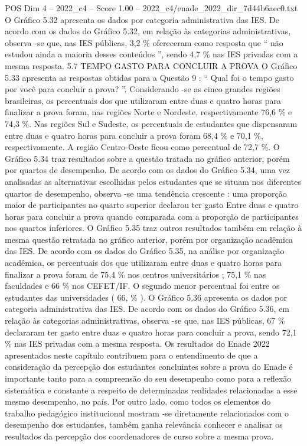 \begin{textsample}{POS Dim 4 – 2022\_c4 – Score 1.00 – 2022\_c4/enade\_2022\_dir\_7d44b6aec0.txt}
O Gráfico 5.32 apresenta os dados por categoria administrativa das IES.
De acordo com os dados do Gráfico 5.32, em relação às categorias administrativas, observa -se que, nas IES públicas, 3,2 \% ofereceram como resposta que “ não estudou ainda a maioria desses conteúdos ”, sendo 4,7 \% nas IES privadas com a mesma resposta. 5.7 TEMPO GASTO PARA CONCLUIR A PROVA O Gráfico 5.33 apresenta as respostas obtidas para a Questão 9 : “ Qual foi o tempo gasto por você para concluir a prova? ”.
Considerando -se as cinco grandes regiões brasileiras, os percentuais dos que utilizaram entre duas e quatro horas para finalizar a prova foram, nas regiões Norte e Nordeste, respectivamente 76,6 \% e 74,3 \%.
Nas regiões Sul e Sudeste, os percentuais de estudantes que dispensaram entre duas e quatro horas para concluir a prova foram 68,4 \% e 70,1 \%, respectivamente.
A região Centro-Oeste ficou como percentual de 72,7 \%.
O Gráfico 5.34 traz resultados sobre a questão tratada no gráfico anterior, porém por quartos de desempenho.
De acordo com os dados do Gráfico 5.34, uma vez analisadas as alternativas escolhidas pelos estudantes que se situam nos diferentes quartos de desempenho, observa -se uma tendência crescente : uma proporção maior de participantes no quarto superior declarou ter gasto Entre duas e quatro horas para concluir a prova quando comparada com a proporção de participantes nos quartos inferiores.
O Gráfico 5.35 traz outros resultados também em relação à mesma questão retratada no gráfico anterior, porém por organização acadêmica das IES.
De acordo com os dados do Gráfico 5.35, na análise por organização acadêmica, os percentuais dos que utilizaram entre duas e quatro horas para finalizar a prova foram de 75,4 \% nos centros universitários ; 75,1 \% nas faculdades e 66 \% nos CEFET/IF.
O segundo menor percentual foi entre os estudantes das universidades ( 66, \% ).
O Gráfico 5.36 apresenta os dados por categoria administrativa das IES.
De acordo com os dados do Gráfico 5.36, em relação às categorias administrativas, observa -se que, nas IES públicas, 67 \% declararam ter gasto entre duas e quatro horas para concluir a prova, sendo 72,1 \% nas IES privadas com a mesma resposta.
Os resultados do Enade 2022 apresentados neste capítulo contribuem para o entendimento de que a consideração da percepção dos estudantes concluintes sobre a prova do Enade é importante tanto para a compreensão do seu desempenho como para a reflexão sistemática e constante a respeito de determinadas realidades relacionadas a esse mesmo desempenho, no país.
Por outro lado, como todos os elementos do trabalho pedagógico institucional mostram -se diretamente relacionados com o desempenho dos estudantes, também ganha relevância conhecer e analisar os resultados da percepção dos coordenadores de curso sobre a mesma prova.

\end{textsample}
